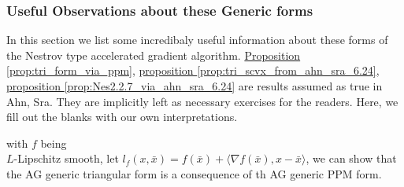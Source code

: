 \documentclass[12pt]{article}
\begin{document}
        \subsubsection*{Useful Observations about these Generic forms}\label{sec:AG_useful_information}
            In this section we list some incredibaly useful information about these forms of the Nestrov type accelerated gradient algorithm. 
            \hyperref[prop:tri_form_via_ppm]{Proposition \ref*{prop:tri_form_via_ppm}}, 
            \hyperref[prop:tri_scvx_from_ahn_sra_6.24]{proposition \ref*{prop:tri_scvx_from_ahn_sra_6.24}}, 
            \hyperref[prop:Nes2.2.7_via_ahn_sra_6.24]{proposition \ref*{prop:Nes2.2.7_via_ahn_sra_6.24}}
            are results assumed as true in Ahn, Sra. 
            They are implicitly left as necessary exercises for the readers. 
            Here, we fill out the blanks with our own interpretations. 
            \begin{proposition}
                \label{prop:tri_form_via_ppm}
                with $f$ being \\
                $L$-Lipschitz smooth, 
                let $l_f(x, \bar x) = f(\bar x) + \langle \nabla f(\bar x), x - \bar x\rangle$, we can show that the AG generic triangular form is a consequence of th AG generic PPM form. 
            \end{proposition}
\end{document}
